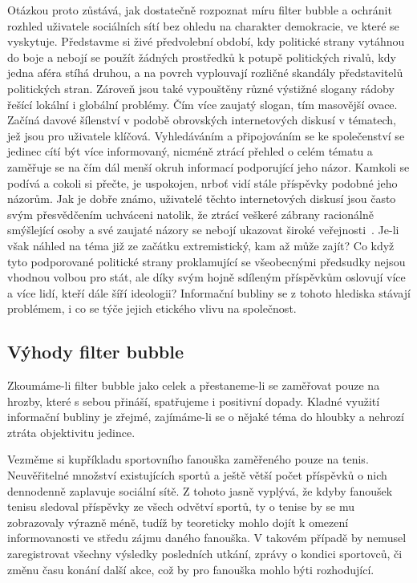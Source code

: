 \documentclass[12pt, a4paper]{article}
\numberwithin{equation}{section} 	%
\begin{document}
Otázkou proto zůstává, jak dostatečně rozpoznat míru filter bubble a ochránit rozhled uživatele sociálních sítí bez ohledu na charakter demokracie, ve které se vyskytuje. Představme si živé předvolební období, kdy politické strany vytáhnou do boje a nebojí se použít žádných prostředků k potupě politických rivalů, kdy jedna aféra stíhá druhou, a na povrch vyplouvají rozličné skandály představitelů politických stran. Zároveň jsou také vypouštěny různé výstižné slogany rádoby řešící lokální i globální problémy. Čím více zaujatý slogan, tím masovější ovace. Začíná davové šílenství v podobě obrovských internetových diskusí v tématech, jež jsou pro uživatele klíčová. Vyhledáváním a připojováním se ke společenství se jedinec cítí být více informovaný, nicméně ztrácí přehled o celém tématu a zaměřuje se na čím dál menší okruh informací podporující jeho názor. Kamkoli se podívá a cokoli si přečte, je uspokojen, nrboť vidí stále příspěvky podobné jeho názorům. Jak je dobře známo, uživatelé těchto internetových diskusí jsou často svým přesvědčením uchváceni natolik, že ztrácí veškeré zábrany racionálně smýšlející osoby a své zaujaté názory se nebojí ukazovat široké veřejnosti~\cite{DemocracyOnline}. Je-li však náhled na téma již ze začátku extremistický, kam až může zajít? Co když tyto podporované politické strany proklamující se všeobecnými předsudky nejsou vhodnou volbou pro stát, ale díky svým hojně sdíleným příspěvkům oslovují více a více lidí, kteří dále šíří ideologii? Informační bubliny se z tohoto hlediska stávají problémem, i co se týče jejich etického vlivu na společnost.


\subsection{Výhody filter bubble}
\noindent Zkoumáme-li filter bubble jako celek a přestaneme-li se zaměřovat pouze na hrozby, které s sebou přináší, spatřujeme i positivní dopady. Kladné využití informační bubliny je zřejmé, zajímáme-li se o nějaké téma do hloubky a nehrozí ztráta objektivitu jedince.

Vezměme si kupříkladu sportovního fanouška zaměřeného pouze na tenis. Neuvěřitelné množství existujících sportů a ještě větší počet příspěvků o nich dennodenně zaplavuje sociální sítě. Z tohoto jasně vyplývá, že kdyby fanoušek tenisu sledoval příspěvky ze všech odvětví sportů, ty o tenise by se mu zobrazovaly výrazně méně, tudíž by teoreticky mohlo dojít k omezení informovanosti ve středu zájmu daného fanouška. V takovém případě by nemusel zaregistrovat všechny výsledky posledních utkání, zprávy o kondici sportovců, či změnu času konání další akce, což by pro fanouška mohlo býti rozhodující.
\end{document}
